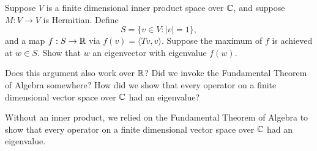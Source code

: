 \documentclass{homework}
\begin{document}
\begin{problem}\label{spectral-theorem-via-maxima}Suppose $V$ is a finite dimensional inner product space over $\mathbb{C}$,
  and suppose $M : V \to V$ is Hermitian.  Define
  \[
    S = \{ v \in V : |v| = 1 \},
  \]
  and a map $f : S \to \mathbb{R}$ via $f(v) = \langle Tv, v \rangle$.
  Suppose the maximum of $f$ is achieved at $w \in S$.  Show that $w$
  an eigenvector with eigenvalue $f(w)$.

  Does this argument also work over $\mathbb{R}$?  Did we invoke the
  Fundamental Theorem of Algebra somewhere?  How did we show that
  every operator on a finite dimensional vector space over $\mathbb{C}$ had an
  eigenvalue?
  
  Without an inner product, we relied on the Fundamental Theorem of
  Algebra to show that every operator on a finite dimensional vector
  space over $\mathbb{C}$ had an eigenvalue.
\end{problem}
\end{document}
